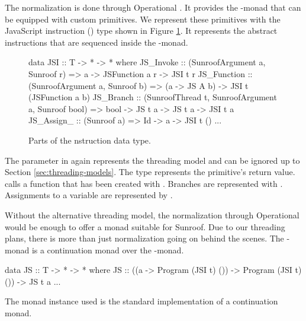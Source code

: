 The normalization is done through Operational 
\cite{Apfelmus:10:Operational,Hackage:10:Operational}.
It provides the -monad that
can be equipped with custom primitives.
We represent these primitives with the JavaScript instruction
(\JSI)
type shown in Figure \ref{fig:jsi-definition}. It represents the 
abstract instructions that are sequenced inside 
the -monad.
\begin{figure}
\begin{Code}
data JSI :: T -> * -> * where
  JS_Invoke   :: (SunroofArgument a, Sunroof r) 
              => a -> JSFunction a r -> JSI t r
  JS_Function :: (SunroofArgument a, Sunroof b) 
              => (a -> JS A b) -> JSI t (JSFunction a b)
  JS_Branch   :: (SunroofThread t, SunroofArgument a, Sunroof bool) 
              => bool -> JS t a -> JS t a  -> JSI t a
  JS_Assign_  :: (Sunroof a) => Id -> a -> JSI t ()
  ...
\end{Code}
\caption{Parts of the \JSI nstruction data type.}
\label{fig:jsi-definition}
\end{figure}
The parameter  in  again represents 
the threading model and can be ignored up to Section \ref{sec:threading-models}. 
The type  represents the primitive's return value. 
 calls a function that has been created with .
Branches are represented with . Assignments to a variable
are represented by .

Without the alternative threading model, 
the normalization through Operational
would be enough to offer a monad suitable for Sunroof.
Due to our threading plans, there is more than just 
normalization going on behind the scenes. 
The \JS-monad is a continuation monad over the 
-monad.
\begin{Code}
data JS :: T -> * -> * where
  JS :: ((a -> Program (JSI t) ()) -> Program (JSI t) ()) -> JS t a
  ...
\end{Code}
The monad instance used is the standard implementation of 
a continuation monad.

